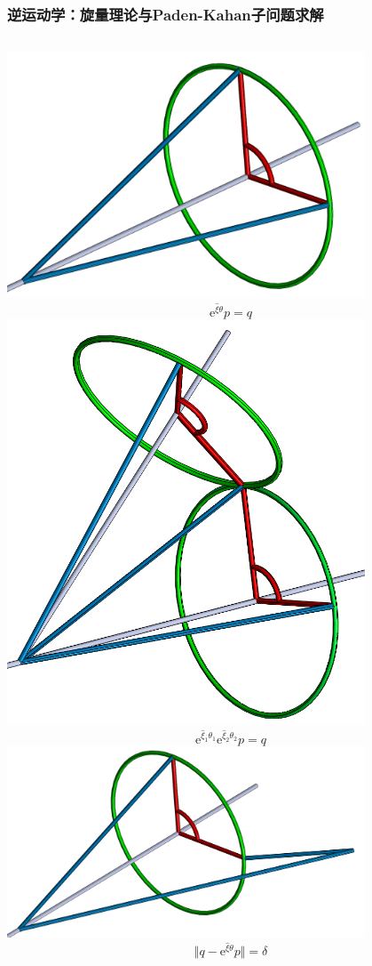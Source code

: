 \documentclass{beamer}
\begin{document}
\begin{frame}
    \frametitle{逆运动学：旋量理论与Paden-Kahan子问题求解}
    \centering
    \begin{columns}
        \includegraphics[width=0.8\textwidth]{子问题1.png}
        \[
            \mathrm{e}^{\hat{\xi}\theta}p = q
        \]
        \includegraphics[width=0.8\textwidth]{子问题2.png}
        \[
            \mathrm{e}^{\hat{\xi}_1\theta_1}\mathrm{e}^{\hat{\xi}_2\theta_2}p = q
        \]
        \includegraphics[width=0.8\textwidth]{子问题3.png}
        \[
            \Vert q - \mathrm{e}^{\hat{\xi}\theta}p \Vert = \delta
        \]
    \end{columns}
\end{frame}
\end{document}
